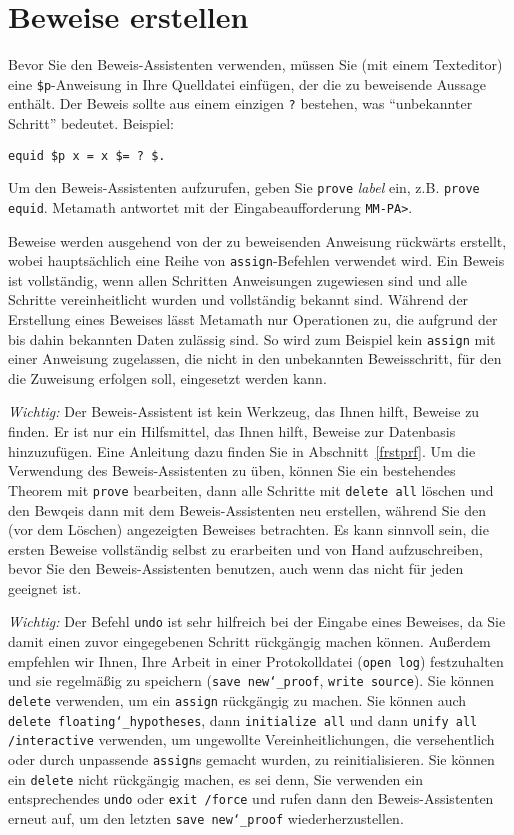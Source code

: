 \section{Beweise erstellen}\label{pfcommands}

Bevor Sie den Beweis-Assistenten verwenden, müssen Sie (mit einem Texteditor) eine \texttt{\$p}-Anweisung in Ihre Quelldatei einfügen, der die zu beweisende Aussage enthält.  Der Beweis sollte aus einem einzigen \texttt{?} bestehen, was "`unbekannter Schritt"' bedeutet.  Beispiel:
\begin{verbatim}
equid $p x = x $= ? $.
\end{verbatim}

Um den Beweis-Assistenten aufzurufen, geben Sie \texttt{prove} {\em label} ein, z.B. \texttt{prove equid}.  Metamath antwortet mit der Eingabeaufforderung \texttt{MM-PA>}.

Beweise werden ausgehend von der zu beweisenden Anweisung rückwärts erstellt, wobei hauptsächlich eine Reihe von \texttt{assign}-Befehlen verwendet wird.  Ein Beweis ist vollständig, wenn allen Schritten Anweisungen zugewiesen sind und alle Schritte vereinheitlicht wurden und vollständig bekannt sind.  Während der Erstellung eines Beweises lässt Metamath nur Operationen zu, die aufgrund der bis dahin bekannten Daten zulässig sind.  So wird zum Beispiel kein \texttt{assign} mit einer Anweisung zugelassen, die nicht in den unbekannten Beweisschritt, für den die Zuweisung erfolgen soll, eingesetzt werden kann.

{\em Wichtig:} Der Beweis-Assistent ist kein Werkzeug, das Ihnen hilft, Beweise zu finden.  Er ist nur ein Hilfsmittel, das Ihnen hilft, Beweise zur Datenbasis hinzuzufügen.  Eine Anleitung dazu finden Sie in Abschnitt~\ref{frstprf}. Um die Verwendung des Beweis-Assistenten zu üben, können Sie ein bestehendes Theorem mit  \texttt{prove} bearbeiten, dann alle Schritte mit \texttt{delete all} löschen und den Bewqeis dann mit dem Beweis-Assistenten neu erstellen, während Sie den (vor dem Löschen) angezeigten Beweises betrachten. Es kann sinnvoll sein, die ersten Beweise vollständig selbst zu erarbeiten und von Hand aufzuschreiben, bevor Sie den Beweis-Assistenten benutzen, auch wenn das nicht für jeden geeignet ist.

{\em Wichtig:} Der Befehl \texttt{undo} ist sehr hilfreich bei der Eingabe eines Beweises, da Sie damit einen zuvor eingegebenen Schritt rückgängig machen können. Außerdem empfehlen wir Ihnen, Ihre Arbeit in einer Protokolldatei (\texttt{open log}) festzuhalten und sie regelmäßig zu speichern (\texttt{save new{\char`\_}proof}, \texttt{write source}). Sie können \texttt{delete} verwenden, um ein \texttt{assign} rückgängig zu machen. Sie können auch \texttt{delete floating{\char`\_}hypotheses}, dann \texttt{initialize all} und dann \texttt{unify all /interactive} verwenden, um ungewollte Vereinheitlichungen, die versehentlich oder durch unpassende \texttt{assign}s gemacht wurden, zu reinitialisieren.  Sie können ein \texttt{delete} nicht rückgängig machen, es sei denn, Sie verwenden ein entsprechendes \texttt{undo} oder \texttt{exit /force} und rufen dann den Beweis-Assistenten erneut auf, um den letzten \texttt{save new{\char`\_}proof} wiederherzustellen.

